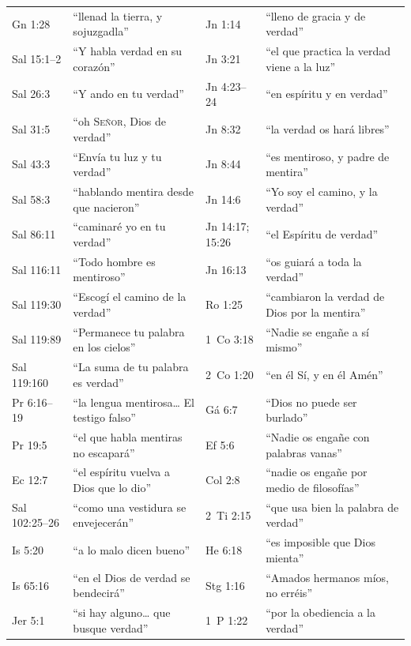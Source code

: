\documentclass[11pt,letterpaper]{article}
\newcommand{\SENOR}{\textsc{Señor}}
\begin{document}
\begin{center}\small\renewcommand{\arraystretch}{1.12}
\begin{tabular}{@{}L{2.2cm}L{5.0cm}|L{2.2cm}L{5.0cm}@{}}
\toprule
Gn 1:28 & ``llenad la tierra, y sojuzgadla'' & Jn 1:14 & ``lleno de gracia y de verdad'' \\
Sal 15:1--2 & ``Y habla verdad en su corazón'' & Jn 3:21 & ``el que practica la verdad viene a la luz'' \\
Sal 26:3 & ``Y ando en tu verdad'' & Jn 4:23--24 & ``en espíritu y en verdad'' \\
Sal 31:5 & ``oh \SENOR{}, Dios de verdad'' & Jn 8:32 & ``la verdad os hará libres'' \\
Sal 43:3 & ``Envía tu luz y tu verdad'' & Jn 8:44 & ``es mentiroso, y padre de mentira'' \\
Sal 58:3 & ``hablando mentira desde que nacieron'' & Jn 14:6 & ``Yo soy el camino, y la verdad'' \\
Sal 86:11 & ``caminaré yo en tu verdad'' & Jn 14:17; 15:26 & ``el Espíritu de verdad'' \\
Sal 116:11 & ``Todo hombre es mentiroso'' & Jn 16:13 & ``os guiará a toda la verdad'' \\
Sal 119:30 & ``Escogí el camino de la verdad'' & Ro 1:25 & ``cambiaron la verdad de Dios por la mentira'' \\
Sal 119:89 & ``Permanece tu palabra en los cielos'' & 1~Co 3:18 & ``Nadie se engañe a sí mismo'' \\
Sal 119:160 & ``La suma de tu palabra es verdad'' & 2~Co 1:20 & ``en él Sí, y en él Amén'' \\
Pr 6:16--19 & ``la lengua mentirosa\ldots{} El testigo falso'' & Gá 6:7 & ``Dios no puede ser burlado'' \\
Pr 19:5 & ``el que habla mentiras no escapará'' & Ef 5:6 & ``Nadie os engañe con palabras vanas'' \\
Ec 12:7 & ``el espíritu vuelva a Dios que lo dio'' & Col 2:8 & ``nadie os engañe por medio de filosofías'' \\
Sal 102:25--26 & ``como una vestidura se envejecerán'' & 2~Ti 2:15 & ``que usa bien la palabra de verdad'' \\
Is 5:20 & ``a lo malo dicen bueno'' & He 6:18 & ``es imposible que Dios mienta'' \\
Is 65:16 & ``en el Dios de verdad se bendecirá'' & Stg 1:16 & ``Amados hermanos míos, no erréis'' \\
Jer 5:1 & ``si hay alguno\ldots{} que busque verdad'' & 1~P 1:22 & ``por la obediencia a la verdad'' \\

\end{tabular}
\end{center}
\end{document}
